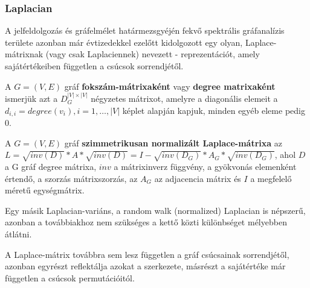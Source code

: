 \subsubsection{Laplacian}
A jelfeldolgozás és gráfelmélet határmezsgyéjén fekvő spektrális gráfanalízis területe azonban már évtizedekkel ezelőtt kidolgozott egy olyan, Laplace-mátrixnak (vagy csak Laplaciennek) nevezett - reprezentációt\cite{spectral_graph}, amely sajátértékeiben független a csúcsok sorrendjétől.

\begin{definition}
A $G=(V,E)$ gráf \textbf{fokszám-mátrixaként} vagy \textbf{degree matrixaként} ismerjük azt a $D_G^{|V| \times |V|}$ négyzetes mátrixot, amelyre a diagonális elemeit a $d_{i,i} = degree(v_i), i=1, \ldots, |V|$ képlet alapján kapjuk, minden egyéb eleme pedig 0.
\end{definition}

\begin{definition}
A $G=(V,E)$ gráf \textbf{szimmetrikusan normalizált Laplace-mátrixa} az $L = \sqrt{inv(D)} * A * \sqrt{inv(D)} = I - \sqrt{inv(D_G)} * A_G * \sqrt{inv(D_G)}$, ahol $D$ a G gráf degree mátrixa, $inv$ a mátrixinverz függvény, a gyökvonás elemenként értendő, a szorzás mátrixszorzás, az $A_G$ az adjacencia mátrix és $I$ a megfelelő méretű egységmátrix.
\end{definition}

\begin{note}
Egy másik Laplacian-variáns, a random walk (normalized) Laplacian is népszerű, azonban a továbbiakhoz nem szükséges a kettő közti különbséget mélyebben átlátni.
\end{note}

A Laplace-mátrix továbbra sem lesz független a gráf csúcsainak sorrendjétől, azonban egyrészt reflektálja azokat a szerkezete, másrészt a sajátértéke már független a csúcsok permutációitól.

